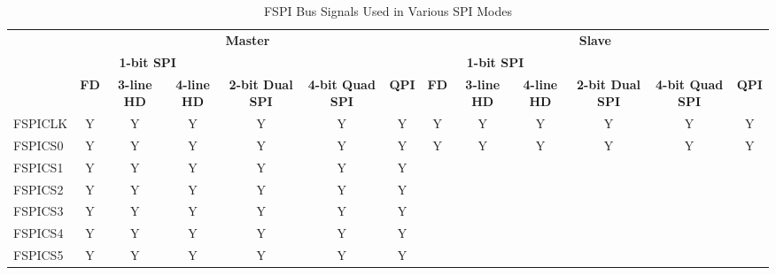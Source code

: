 \documentclass[main\_\_EN.tex]{subfiles}
\begin{document}
\begin{landscape}
\begin{table}[H]
    \centering
    \caption{FSPI Bus Signals Used in Various SPI Modes}
    \label{tab:pins-singals-used-in-various-spi-modes}

    \begin{threeparttable}
    \begin{tabular}{ |p{3.0cm} |c|c|c|c|c|c|c|c|c|c|c|c| }
    \hline
        \rowcolor{lightgray}
        & \multicolumn{6}{c|}{\textbf{Master}} & \multicolumn{6}{c|}{\textbf{Slave}} \\\cline{2-13}
        \rowcolor{lightgray}
        & \multicolumn{3}{c|}{\textbf{1-bit SPI}} & & & & \multicolumn{3}{c|}{\textbf{1-bit SPI}} & & & \\ \cline{2-4} \cline{8-10}
        \rowcolor{lightgray}
        \multirow{-3}{*}{\textbf{FSPI Bus Signal}} & \textbf{FD\tnote{1}} & \textbf{3-line HD\tnote{2}} & \textbf{4-line HD} & \multirow{-2}{*}{\textbf{2-bit Dual SPI}} & \multirow{-2}{*}{\textbf{4-bit Quad SPI}} & \multirow{-2}{*}{\textbf{QPI}} & \textbf{FD} & \textbf{3-line HD} & \textbf{4-line HD} & \multirow{-2}{*}{\textbf{2-bit Dual SPI}} & \multirow{-2}{*}{\textbf{4-bit Quad SPI}} & \multirow{-2}{*}{\textbf{QPI}} \\ \hline
FSPICLK                  & Y       & Y       & Y       & Y       & Y       & Y      & Y       & Y      & Y       & Y       & Y       & Y      \\ \hline
FSPICS0                  & Y       & Y       & Y       & Y       & Y       & Y      & Y       & Y      & Y       & Y       & Y       & Y      \\ \hline
FSPICS1                  & Y       & Y       & Y       & Y       & Y       & Y      &         &        &         &         &         &        \\ \hline
FSPICS2                  & Y       & Y       & Y       & Y       & Y       & Y      &         &        &         &         &         &        \\ \hline
FSPICS3                  & Y       & Y       & Y       & Y       & Y       & Y      &         &        &         &         &         &        \\ \hline
FSPICS4                  & Y       & Y       & Y       & Y       & Y       & Y      &         &        &         &         &         &        \\ \hline
FSPICS5                  & Y       & Y       & Y       & Y       & Y       & Y      &         &        &         &         &         &        \\ \hline

\end{tabular}
\end{threeparttable}
\end{table}
\end{landscape}
\end{document}
